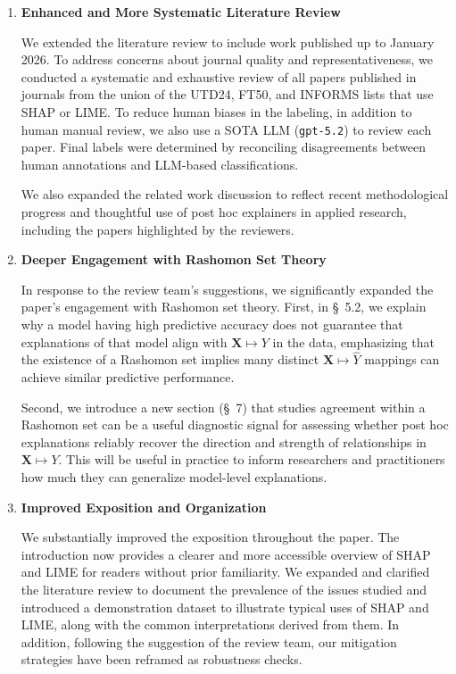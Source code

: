 \documentclass[11pt]{article}
\newcounter{se}[section]
\newcounter{reviewer}
\begin{document}
\begin{sf}
\begin{enumerate}
\item \textbf{Enhanced and More Systematic Literature Review}

We extended the literature review to include work published up to January 2026. To address concerns about journal quality and representativeness, we conducted a systematic and exhaustive review of all papers published in journals from the union of the UTD24, FT50, and INFORMS lists that use SHAP or LIME. To reduce human biases in the labeling, in addition to human manual review, we also use a SOTA LLM (\texttt{gpt-5.2}) to review each paper. Final labels were determined by reconciling disagreements between human annotations and LLM-based classifications. 

We also expanded the related work discussion to reflect recent methodological progress and thoughtful use of post hoc explainers in applied research, including the papers highlighted by the reviewers.

\item \textbf{Deeper Engagement with Rashomon Set Theory}

In response to the review team’s suggestions, we significantly expanded the paper’s engagement with Rashomon set theory. First, in \S~5.2, we explain why a model having high predictive accuracy does not guarantee that explanations of that model align with $\mathbf{X}\mapsto Y$ in the data, emphasizing that the existence of a Rashomon set implies many distinct $\mathbf{X}\mapsto\hat{Y}$ mappings can achieve similar predictive performance.  

Second, we introduce a new section (\S~7) that studies agreement  within a Rashomon set can be a useful diagnostic signal for assessing whether post hoc explanations reliably recover the direction and strength of relationships in $\mathbf{X}\mapsto Y$. This will be useful in practice to inform researchers and practitioners how much they can generalize model-level explanations.

\item \textbf{Improved Exposition and Organization}


We substantially improved the exposition throughout the paper. The introduction now provides a clearer and more accessible overview of SHAP and LIME for readers without prior familiarity. We expanded and clarified the literature review to document the prevalence of the issues studied and introduced a demonstration dataset to illustrate typical uses of SHAP and LIME, along with the common interpretations derived from them. In addition, following the suggestion of the review team, our mitigation strategies have been reframed as robustness checks.


\end{enumerate}
\end{sf}
\end{document}
